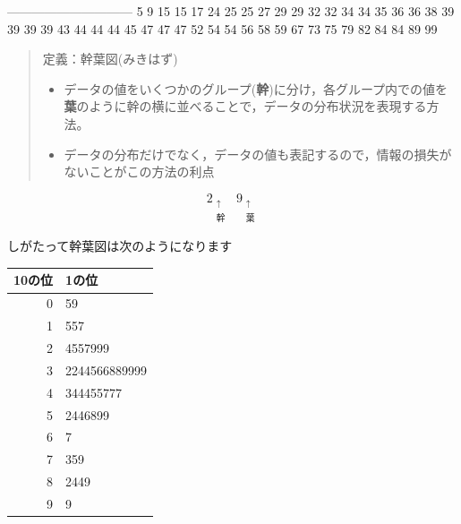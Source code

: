 \documentclass[
]{book}
\providecommand{\tightlist}{%
  \setlength{\itemsep}{0pt}\setlength{\parskip}{0pt}}
\theoremstyle{definition}
\theoremstyle{definition}
\theoremstyle{definition}
\theoremstyle{definition}
\theoremstyle{remark}
\begin{document}
\textbar---\textbar---\textbar---\textbar---\textbar---\textbar---\textbar---\textbar---\textbar---\textbar---\textbar{}
\textbar{} 5 \textbar{} 9 \textbar{} 15 \textbar{} 15 \textbar{} 17 \textbar{} 24 \textbar{} 25 \textbar{} 25 \textbar{} 27 \textbar{} 29 \textbar{}
 \textbar{} 29 \textbar{} 32 \textbar{} 32 \textbar{} 34 \textbar{} 34 \textbar{} 35 \textbar{} 36 \textbar{} 36 \textbar{} 38 \textbar{}
 \textbar{} 39 \textbar{} 39 \textbar{} 39 \textbar{} 39 \textbar{} 43 \textbar{} 44 \textbar{} 44 \textbar{} 44 \textbar{} 45 \textbar{}
 \textbar{} 47 \textbar{} 47 \textbar{} 47 \textbar{} 52 \textbar{} 54 \textbar{} 54 \textbar{} 56 \textbar{} 58 \textbar{} 59 \textbar{}
 \textbar{} 67 \textbar{} 73 \textbar{} 75 \textbar{} 79 \textbar{} 82 \textbar{} 84 \textbar{} 84 \textbar{} 89 \textbar{} 99 \textbar{}

\begin{quote}
定義：幹葉図(みきはず)

\begin{itemize}
\tightlist
\item
  データの値をいくつかのグループ(\textbf{幹})に分け，各グループ内での値を\textbf{葉}のように幹の横に並べることで，データの分布状況を表現する方法。
\item
  データの分布だけでなく，データの値も表記するので，情報の損失がないことがこの方法の利点
\end{itemize}
\end{quote}

\[
\mathop{2}_{\substack{\uparrow \\ \text{幹}}}
\mathop{9}_{\substack{\uparrow \\ \text{葉}}}
\]

しがたって幹葉図は次のようになります

\begin{longtable}[]{@{}rl@{}}
\toprule()
10の位 & 1の位 \\
\midrule()
\endhead
0 & 59 \\
1 & 557 \\
2 & 4557999 \\
3 & 2244566889999 \\
4 & 344455777 \\
5 & 2446899 \\
6 & 7 \\
7 & 359 \\
8 & 2449 \\
9 & 9 \\
\bottomrule()
\end{longtable}
\end{document}
